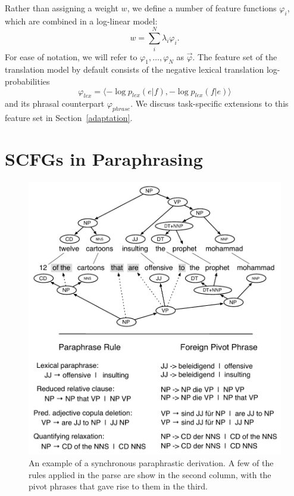 \documentclass[11pt]{article}
\begin{document}
Rather than assigning a weight $w$, we define a number of feature
functions $\varphi_i$, which are combined in a log-linear model:
\begin{equation}
  w = \sum_i^N \lambda_i \varphi_i .
\end{equation}
For ease of notation, we will refer to $\varphi_1, \ldots ,\varphi_N$
as $\vec{\varphi}$. The feature set of the translation model by
default consists of the negative lexical translation log-probabilities
\[
\varphi_{\mathit{lex}} = \langle -\log p_{\mathit{lex}}(e | f), -\log
p_{\mathit{lex}}(f | e)\rangle
\]
and its phrasal counterpart $\varphi_{\mathit{phrase}}$. We discuss
task-specific extensions to this feature set in
Section~\ref{adaptation}.

\section{SCFGs in Paraphrasing} \label{acquisition}

\begin{figure}[!t]
\begin{center}
\includegraphics[width=0.99\linewidth]{figures/example_compression_1col.pdf}
\end{center}
\caption{An example of a synchronous paraphrastic derivation. A few of
  the rules applied in the parse are show in the second column, with
  the pivot phrases that gave rise to them in the third.}
\end{figure}
\end{document}
